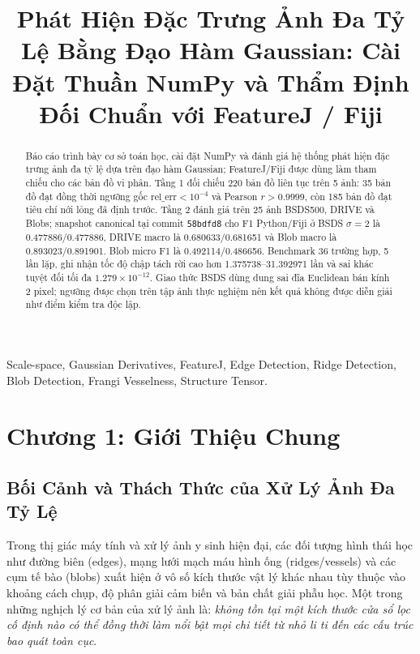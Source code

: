 \documentclass[conference]{IEEEtran}
\begin{document}
\title{Phát Hiện Đặc Trưng Ảnh Đa Tỷ Lệ Bằng Đạo Hàm Gaussian: Cài Đặt Thuần NumPy và Thẩm Định Đối Chuẩn với FeatureJ / Fiji}

\author{
}

\maketitle

\begin{abstract}
Báo cáo trình bày cơ sở toán học, cài đặt NumPy và đánh giá hệ thống phát hiện đặc trưng ảnh đa tỷ lệ dựa trên đạo hàm Gaussian; FeatureJ/Fiji được dùng làm tham chiếu cho các bản đồ vi phân. Tầng 1 đối chiếu 220 bản đồ liên tục trên 5 ảnh: 35 bản đồ đạt đồng thời ngưỡng gốc $\mathrm{rel\_err}<10^{-4}$ và Pearson $r>0.9999$, còn 185 bản đồ đạt tiêu chí nới lỏng đã định trước. Tầng 2 đánh giá trên 25 ảnh BSDS500, DRIVE và Blobs; snapshot canonical tại commit \texttt{58bdfd8} cho F1 Python/Fiji ở BSDS $\sigma=2$ là 0.477886/0.477886, DRIVE macro là 0.680633/0.681651 và Blob macro là 0.893023/0.891901. Blob micro F1 là 0.492114/0.486656. Benchmark 36 trường hợp, 5 lần lặp, ghi nhận tốc độ chập tách rời cao hơn 1.375738--31.392971 lần và sai khác tuyệt đối tối đa $1.279\times10^{-12}$. Giao thức BSDS dùng dung sai đĩa Euclidean bán kính 2 pixel; ngưỡng được chọn trên tập ảnh thực nghiệm nên kết quả không được diễn giải như điểm kiểm tra độc lập.
\end{abstract}

\begin{IEEEkeywords}
Scale-space, Gaussian Derivatives, FeatureJ, Edge Detection, Ridge Detection, Blob Detection, Frangi Vesselness, Structure Tensor.
\end{IEEEkeywords}

\section{Chương 1: Giới Thiệu Chung}

\subsection{Bối Cảnh và Thách Thức của Xử Lý Ảnh Đa Tỷ Lệ}
Trong thị giác máy tính và xử lý ảnh y sinh hiện đại, các đối tượng hình thái học như đường biên (edges), mạng lưới mạch máu hình ống (ridges/vessels) và các cụm tế bào (blobs) xuất hiện ở vô số kích thước vật lý khác nhau tùy thuộc vào khoảng cách chụp, độ phân giải cảm biến và bản chất giải phẫu học. Một trong những nghịch lý cơ bản của xử lý ảnh là: \textit{không tồn tại một kích thước cửa sổ lọc cố định nào có thể đồng thời làm nổi bật mọi chi tiết từ nhỏ li ti đến các cấu trúc bao quát toàn cục}.
\end{document}
